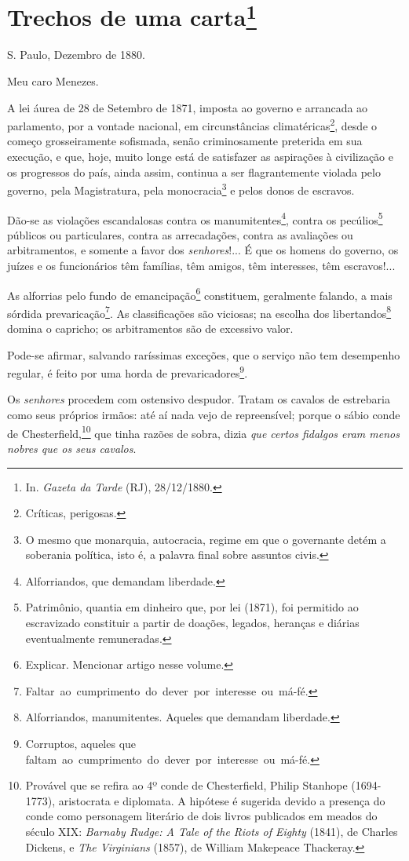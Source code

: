 \chapter{Trechos de uma carta\footnote[*]{In. \emph{Gazeta da Tarde}
  (RJ), 28/12/1880.}}

S. Paulo, Dezembro de 1880.

Meu caro Menezes.

A lei áurea de 28 de Setembro de 1871, imposta ao governo e arrancada ao
parlamento, por a vontade nacional, em circunstâncias
climatéricas\footnote{Críticas, perigosas.}, desde o começo
grosseiramente sofismada, senão criminosamente preterida em sua
execução, e que, hoje, muito longe está de satisfazer as aspirações à
civilização e os progressos do país, ainda assim, continua a ser
flagrantemente violada pelo governo, pela Magistratura, pela
monocracia\footnote{O mesmo que monarquia, autocracia, regime em que o
  governante detém a soberania política, isto é, a palavra final sobre
  assuntos civis.} e pelos donos de escravos.

Dão-se as violações escandalosas contra os manumitentes\footnote{
  Alforriandos, que demandam liberdade.}, contra os pecúlios\footnote{
  Patrimônio, quantia em dinheiro que, por lei (1871), foi permitido ao
  escravizado constituir a partir de doações, legados, heranças e
  diárias eventualmente remuneradas.} públicos ou particulares, contra
as arrecadações, contra as avaliações ou arbitramentos, e somente a
favor dos \emph{senhores}!... É que os homens do governo, os juízes e os
funcionários têm famílias, têm amigos, têm interesses, têm escravos!...

As alforrias pelo fundo de emancipação\footnote{Explicar. Mencionar
  artigo nesse volume.} constituem, geralmente falando, a mais sórdida
prevaricação\footnote{
  Faltar~ao~cumprimento~do~dever~por~interesse~ou~má-fé.}. As
classificações são viciosas; na escolha dos libertandos\footnote{
  Alforriandos, manumitentes. Aqueles que demandam liberdade.} domina o
capricho; os arbitramentos são de excessivo valor.

Pode-se afirmar, salvando raríssimas exceções, que o serviço não tem
desempenho regular, é feito por uma horda de prevaricadores\footnote{
  Corruptos, aqueles que
  faltam~ao~cumprimento~do~dever~por~interesse~ou~má-fé.}.

Os \emph{senhores} procedem com ostensivo despudor. Tratam os cavalos de
estrebaria como seus próprios irmãos: até aí nada vejo de repreensível;
porque o sábio conde de Chesterfield,\footnote{Provável que se refira
  ao 4º conde de Chesterfield, Philip Stanhope (1694-1773), aristocrata
  e diplomata. A hipótese é sugerida devido a presença do conde como
  personagem literário de dois livros publicados em meados do século
  XIX: \emph{Barnaby Rudge: A Tale of the Riots of Eighty} (1841), de
  Charles Dickens, e \emph{The Virginians} (1857), de William Makepeace
  Thackeray.} que tinha razões de sobra, dizia \emph{que certos fidalgos
eram menos nobres que os seus cavalos}.

